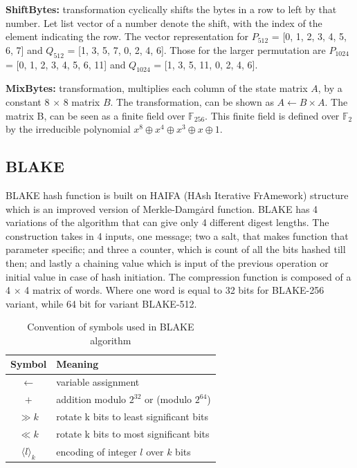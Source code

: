 \documentclass[12pt]{artikel3}                  %
\begin{document}
{\bf ShiftBytes:} transformation cyclically shifts the bytes in a row to left by that number. Let list vector 
of a number denote the shift, with the index of the element indicating the row. The vector representation for
$P_{512}$ = [0, 1, 2, 3, 4, 5, 6, 7] and $Q_{512}$ = [1, 3, 5, 7, 0, 2, 4, 6]. Those for the larger permutation 
are $P_{1024}$ = [0, 1, 2, 3, 4, 5, 6, 11] and $Q_{1024}$ = [1, 3, 5, 11, 0, 2, 4, 6].

{\bf MixBytes:} transformation, multiplies each column of the state matrix $A$, by a constant 8 $\times$ 8 matrix
$B$. The transformation, can be shown as $ A \gets B \times A$. The matrix B, can be seen as a finite field over 
$\mathbb{F}_{256}$. This finite field is defined over $\mathbb{F}_{2}$ by the irreducible polynomial 
$x^{8} \oplus x^{4} \oplus x^{3} \oplus x \oplus 1$.

\subsection{BLAKE}

BLAKE\cite{00002} hash function is built on HAIFA (HAsh Iterative FrAmework) structure \cite{00020} which is an improved
version of Merkle-Damg\.{a}rd function. BLAKE has 4 variations of the algorithm that can give only 4 different digest
lengths. The construction takes in 4 inputs, one message; two a salt, that makes function that parameter specific; and
three a counter, which is count of all the bits hashed till then; and lastly a chaining value which is input of the previous
operation or initial value in case of hash initiation. The compression function is composed of a 4 $\times$ 4 matrix of words.
Where one word is equal to 32 bits for BLAKE-256 variant, while 64 bit for variant BLAKE-512.

\begin{table}[h]
  \begin{center}
    \begin{tabular}{ c l } \hline
      Symbol                 & Meaning \\ \hline
      $\gets$                    & variable assignment \\
      $+$                    & addition modulo $2^{32}$ or (modulo $2^{64}$) \\
      $\gg k$                  & rotate k bits to least significant bits \\
      $\ll k$                  & rotate k bits to most significant bits \\
      $\langle l \rangle_{k}$ & encoding of integer $l$ over $k$ bits \\ \hline
    \end{tabular}
    \caption{Convention of symbols used in BLAKE algorithm}
  \end{center}
\end{table}
\end{document}
